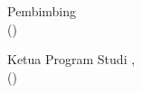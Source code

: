 \begin{center}
     
    Pembimbing \\[1.2cm]
    
    
    (\pembimbing) \\
    \pembimbingNIDN
    
    
    
    
        
    
    
        
\vspace{0.5em}
    Ketua Program Studi \program, \\[1.2cm]
    
    
    (\kaprodi) \\
    \kaprodiNIDN
    
    
\end{center}